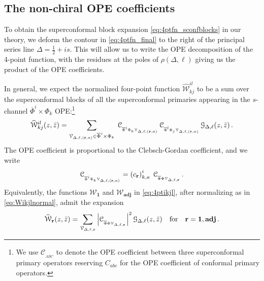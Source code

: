 \documentclass[11pt]{article}
\newcommand{\zb}{\bar{z}}
\newcommand{\Phib}{\overline{\Phi}}
\newcommand{\cope}[1]{\mathcal{C}_{_{#1}}}
\begin{document}
\subsection{The non-chiral OPE coefficients}
\label{sec:OPEcoeffs}

To obtain the superconformal block expansion \eqref{eq:4ptfn_sconfblocks} in our theory, we deform the contour in \eqref{eq:4ptfn_final} to the right of the principal series line $\Delta = \frac{1}{2}+is$. This will allow us to write the OPE decomposition of the 4-point function, with the residues at the poles of $\rho(\Delta, \ell)$ giving us the product of the OPE coefficients. 


In general, we expect the normalized four-point function $\widehat{\mathcal{W}}^{il}_{kj}$ to be a sum over the superconformal blocks of all the superconformal primaries appearing in the $s$-channel  $\Phib^i \times \Phi_k$ OPE:\footnote{We use $\cope{ABC}$ to denote the OPE coefficient between three superconformal primary operators reserving $C_{abc}$ for the OPE coefficient of conformal primary operators.}
%
\begin{equation}\label{eq:4ptfn_sconfblocksij}
\widehat{\mathcal{W}}^{il}_{kj}(z,\zb) = \sum_{\mathcal{V}_{\Delta,\ell,({\bf r},a)} \in \Phib^i \times \Phi_k}\;
  \cope{\Phib^i\Phi_k\mathcal{V}_{\Delta,\ell,({\bf r},a)} } \, \cope{\Phib^l\Phi_j\mathcal{V}_{\Delta,\ell,({\bf r},a)} }
  \,\mathcal{G}_{\Delta,\ell}(z,\zb)\,.
\end{equation}
%
The OPE coefficient is proportional to the Clebsch-Gordan coefficient, and we write
%
\begin{equation}
\cope{\Phib^i\Phi_k\mathcal{V}_{\Delta,\ell,({\bf r},a)}} = \left(c_{\bf r}\right)^i_{k,a}\;\cope{\Phib\Phi\mathcal{V}_{\Delta,\ell,{\bf r}}} \,.
\end{equation}
%
Equivalently, the functions $\mathcal{W}_\mathbf{1}$ and $\mathcal{W}_\mathbf{adj}$ in \eqref{eq:4ptikjl}, after normalizing as in \eqref{eq:Wikjlnormal}, admit the expansion
%
\begin{equation}\label{eqn:SBE_1_adj}
\widehat{\mathcal W}_{\bf r}(z, \zb)=\sum_{\mathcal{V}_{\Delta,\ell,{\bf r}}}\left|\cope{\Phib\Phi\mathcal{V}_{\Delta,\ell,{\bf r}}}\right|^2 \mathcal{G}_{\Delta,\ell}(z,\zb)\quad{\rm for}\quad{\bf r}={\bf 1},{\bf adj}\,.
\end{equation}
%
\end{document}
